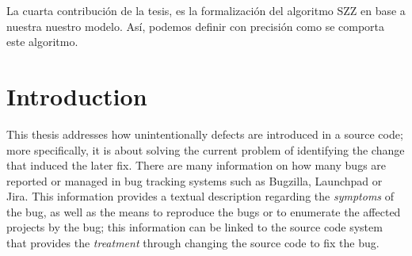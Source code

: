 \documentclass[a4paper, 12pt]{book}
\begin{document}
La cuarta contribuci\'on de la tesis, es la formalizaci\'on del algoritmo SZZ en base a nuestra nuestro modelo. As\'i, podemos definir con precisi\'on como se comporta este algoritmo.






\tableofcontents
\cleardoublepage
\listoffigures %
\cleardoublepage
\listoftables %



\cleardoublepage
\chapter{Introduction}
\label{sec:Introduction} %
This thesis addresses how unintentionally defects are introduced in a source code; more specifically, it is about solving the current problem of identifying the change that induced the later fix. There are many information on how many bugs are reported or managed in bug tracking systems such as Bugzilla, Launchpad or Jira. This information provides a textual description regarding the \emph{symptoms} of the bug, as well as the means to reproduce the bugs or to enumerate the affected projects by the bug; this information can be linked to the source code system that provides the \emph{treatment} through changing the source code to fix the bug. 
\end{document}
